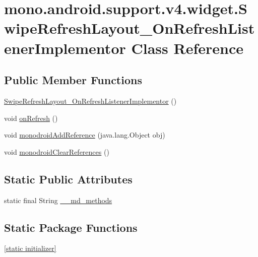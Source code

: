 \hypertarget{classmono_1_1android_1_1support_1_1v4_1_1widget_1_1_swipe_refresh_layout___on_refresh_listener_implementor}{
\section{mono.android.support.v4.widget.SwipeRefreshLayout\_\-OnRefreshListenerImplementor Class Reference}
\label{classmono_1_1android_1_1support_1_1v4_1_1widget_1_1_swipe_refresh_layout___on_refresh_listener_implementor}
}
\subsection*{Public Member Functions}
\begin{CompactItemize}
\item 
\hyperlink{classmono_1_1android_1_1support_1_1v4_1_1widget_1_1_swipe_refresh_layout___on_refresh_listener_implementor_e5ee8d7d91388b8ea9bccbfba5f74438}{SwipeRefreshLayout\_\-OnRefreshListenerImplementor} ()
\item 
void \hyperlink{classmono_1_1android_1_1support_1_1v4_1_1widget_1_1_swipe_refresh_layout___on_refresh_listener_implementor_74f3896d97f8baf7046389f758407a1c}{onRefresh} ()
\item 
void \hyperlink{classmono_1_1android_1_1support_1_1v4_1_1widget_1_1_swipe_refresh_layout___on_refresh_listener_implementor_422bf9708796c9a0bcaaec2137d8200a}{monodroidAddReference} (java.lang.Object obj)
\item 
void \hyperlink{classmono_1_1android_1_1support_1_1v4_1_1widget_1_1_swipe_refresh_layout___on_refresh_listener_implementor_2669d5c1b40a370723a749b9aa381407}{monodroidClearReferences} ()
\end{CompactItemize}
\subsection*{Static Public Attributes}
\begin{CompactItemize}
\item 
static final String \hyperlink{classmono_1_1android_1_1support_1_1v4_1_1widget_1_1_swipe_refresh_layout___on_refresh_listener_implementor_8eae272ca1cc576f55b51a0e86c522b2}{\_\-\_\-md\_\-methods}
\end{CompactItemize}
\subsection*{Static Package Functions}
\begin{CompactItemize}
\item 
\hyperlink{classmono_1_1android_1_1support_1_1v4_1_1widget_1_1_swipe_refresh_layout___on_refresh_listener_implementor_0622210ea846170346861b9df724e3ab}{\mbox{[}static initializer\mbox{]}}
\end{CompactItemize}
